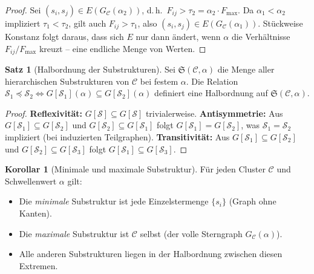 ﻿\documentclass[a4paper,12pt]{report}
\theoremstyle{definition}
\newtheorem{satz}{Satz}
\newtheorem{korollar}{Korollar}
\begin{document}
\begin{proof}
Sei $(s_i, s_j) \in E(G_\mathcal{C}(\alpha_2))$, d.\,h.\ $F_{ij} > \tau_2 = \alpha_2 \cdot F_\mathrm{max}$. Da $\alpha_1 < \alpha_2$ impliziert $\tau_1 < \tau_2$, gilt auch $F_{ij} > \tau_1$, also $(s_i, s_j) \in E(G_\mathcal{C}(\alpha_1))$. Stückweise Konstanz folgt daraus, dass sich $E$ nur dann ändert, wenn $\alpha$ die Verhältnisse $F_{ij}/F_\mathrm{max}$ kreuzt -- eine endliche Menge von Werten.
\end{proof}

\begin{satz}[Halbordnung der Substrukturen]
\label{satz:halbordnung}
Sei $\mathfrak{S}(\mathcal{C}, \alpha)$ die Menge aller hierarchischen Substrukturen von $\mathcal{C}$ bei festem $\alpha$. Die Relation $\mathcal{S}_1 \preceq \mathcal{S}_2 \iff G[\mathcal{S}_1](\alpha) \subseteq G[\mathcal{S}_2](\alpha)$ definiert eine Halbordnung auf $\mathfrak{S}(\mathcal{C}, \alpha)$.
\end{satz}

\begin{proof}
\textbf{Reflexivität:} $G[\mathcal{S}] \subseteq G[\mathcal{S}]$ trivialerweise.
\textbf{Antisymmetrie:} Aus $G[\mathcal{S}_1] \subseteq G[\mathcal{S}_2]$ und $G[\mathcal{S}_2] \subseteq G[\mathcal{S}_1]$ folgt $G[\mathcal{S}_1] = G[\mathcal{S}_2]$, was $\mathcal{S}_1 = \mathcal{S}_2$ impliziert (bei induzierten Teilgraphen).
\textbf{Transitivität:} Aus $G[\mathcal{S}_1] \subseteq G[\mathcal{S}_2]$ und $G[\mathcal{S}_2] \subseteq G[\mathcal{S}_3]$ folgt $G[\mathcal{S}_1] \subseteq G[\mathcal{S}_3]$.
\end{proof}

\begin{korollar}[Minimale und maximale Substruktur]
\label{kor:minmax}
Für jeden Cluster $\mathcal{C}$ und Schwellenwert $\alpha$ gilt:
\begin{itemize}
    \item Die \emph{minimale} Substruktur ist jede Einzelstermenge $\{s_i\}$ (Graph ohne Kanten).
    \item Die \emph{maximale} Substruktur ist $\mathcal{C}$ selbst (der volle Sterngraph $G_\mathcal{C}(\alpha)$).
    \item Alle anderen Substrukturen liegen in der Halbordnung zwischen diesen Extremen.
\end{itemize}
\end{korollar}

\end{document}
